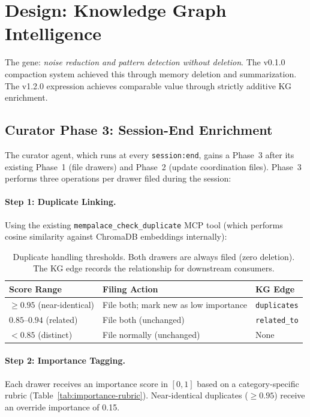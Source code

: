 \documentclass[11pt]{article}
\begin{document}
\section{Design: Knowledge Graph Intelligence}

The gene: \emph{noise reduction and pattern detection without deletion}.
The v0.1.0 compaction system achieved this through memory deletion and
summarization. The v1.2.0 expression achieves comparable value through
strictly additive KG enrichment.

\subsection{Curator Phase 3: Session-End Enrichment}

The curator agent, which runs at every \texttt{session:end}, gains a
Phase~3 after its existing Phase~1 (file drawers) and Phase~2 (update
coordination files). Phase~3 performs three operations per drawer filed
during the session:

\paragraph{Step 1: Duplicate Linking.}
Using the existing \texttt{mempalace\_check\_duplicate} MCP tool (which
performs cosine similarity against ChromaDB embeddings internally):

\begin{table}[H]
\centering
\caption{Duplicate handling thresholds. Both drawers are always filed
(zero deletion). The KG edge records the relationship for downstream
consumers.}
\label{tab:dup-thresholds}
\begin{tabular}{@{}lll@{}}
\toprule
\textbf{Score Range} & \textbf{Filing Action} & \textbf{KG Edge} \\
\midrule
$\geq 0.95$ (near-identical) & File both; mark new as low importance &
    \texttt{duplicates} \\
$0.85$--$0.94$ (related) & File both (unchanged) &
    \texttt{related\_to} \\
$< 0.85$ (distinct) & File normally (unchanged) & None \\
\bottomrule
\end{tabular}
\end{table}

\paragraph{Step 2: Importance Tagging.}
Each drawer receives an importance score in $[0, 1]$ based on a
category-specific rubric (Table~\ref{tab:importance-rubric}). Near-identical
duplicates ($\geq 0.95$) receive an override importance of 0.15.
\end{document}
